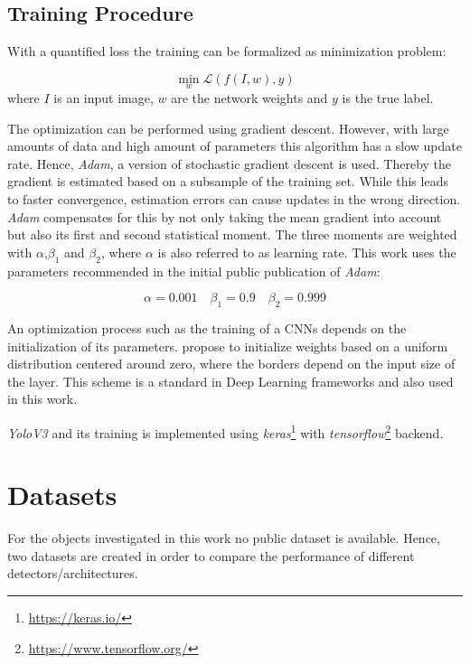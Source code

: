 \subsection{Training Procedure}

With a quantified loss the training can be formalized as minimization problem: 

\begin{equation}
	\min\limits_{w}	\mathcal{L}(f(I,w),y)
\end{equation}
where $I$ is an input image, $w$ are the network weights and $y$ is the true label.

The optimization can be performed using gradient descent. However, with large amounts of data and high amount of parameters this algorithm has a slow update rate. Hence, \textit{Adam}\cite{Kingma2014}, a version of stochastic gradient descent is used. Thereby the gradient is estimated based on a subsample of the training set. While this leads to faster convergence, estimation errors can cause updates in the wrong direction. \textit{Adam} compensates for this by not only taking the mean gradient into account but also its first and second statistical moment. The three moments are weighted with $\alpha$,$\beta_1$ and $\beta_2$, where $\alpha$ is also referred to as learning rate. This work uses the parameters recommended in the initial public publication of \textit{Adam}\cite{Kingma2014}:

$$\alpha=0.001 \quad \beta_1=0.9 \quad \beta_2=0.999$$

An optimization process such as the training of a \acp{CNN} depends on the initialization of its parameters. \citeauthor{Glorot2010} \cite{Glorot2010} propose to initialize weights based on a uniform distribution centered around zero, where the borders depend on the input size of the layer. This scheme is a standard in Deep Learning frameworks and also used in this work.

\textit{YoloV3} and its training is implemented using \textit{keras}\footnote{\url{https://keras.io/}}  with \textit{tensorflow}\footnote{\url{https://www.tensorflow.org/}}  backend. 

\section{Datasets}
\label{sec:datasets}

For the objects investigated in this work no public dataset is available. Hence, two datasets are created in order to compare the performance of different detectors/architectures.

